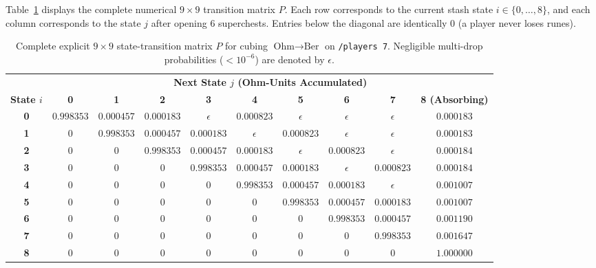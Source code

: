 \documentclass[11pt,reqno]{amsart}
\theoremstyle{definition}
\begin{document}
Table~\ref{tab:app_matrix_P} displays the complete numerical $9 \times 9$ transition matrix $P$. Each row corresponds to the current stash state $i \in \{0, \dots, 8\}$, and each column corresponds to the state $j$ after opening $6$ superchests. Entries below the diagonal are identically $0$ (a player never loses runes).

\begin{table}[htbp]
\centering
\caption{Complete explicit $9 \times 9$ state-transition matrix $P$ for cubing $\text{Ohm}\to\text{Ber}$ on \texttt{/players~7}. Negligible multi-drop probabilities ($< 10^{-6}$) are denoted by $\epsilon$.}
\label{tab:app_matrix_P}
\footnotesize
\setlength{\tabcolsep}{3.5pt}
\begin{tabular}{@{}c ccccccccc@{}}
\toprule
& \multicolumn{9}{c}{\textbf{Next State $j$ (Ohm-Units Accumulated)}} \\
\cmidrule(lr){2-10}
\textbf{State $i$} & \textbf{0} & \textbf{1} & \textbf{2} & \textbf{3} & \textbf{4} & \textbf{5} & \textbf{6} & \textbf{7} & \textbf{8 (Absorbing)} \\
\midrule
\textbf{0} & $0.998353$ & $0.000457$ & $0.000183$ & $\epsilon$ & $0.000823$ & $\epsilon$ & $\epsilon$ & $\epsilon$ & $0.000183$ \\
\textbf{1} & $0$ & $0.998353$ & $0.000457$ & $0.000183$ & $\epsilon$ & $0.000823$ & $\epsilon$ & $\epsilon$ & $0.000183$ \\
\textbf{2} & $0$ & $0$ & $0.998353$ & $0.000457$ & $0.000183$ & $\epsilon$ & $0.000823$ & $\epsilon$ & $0.000184$ \\
\textbf{3} & $0$ & $0$ & $0$ & $0.998353$ & $0.000457$ & $0.000183$ & $\epsilon$ & $0.000823$ & $0.000184$ \\
\textbf{4} & $0$ & $0$ & $0$ & $0$ & $0.998353$ & $0.000457$ & $0.000183$ & $\epsilon$ & $0.001007$ \\
\textbf{5} & $0$ & $0$ & $0$ & $0$ & $0$ & $0.998353$ & $0.000457$ & $0.000183$ & $0.001007$ \\
\textbf{6} & $0$ & $0$ & $0$ & $0$ & $0$ & $0$ & $0.998353$ & $0.000457$ & $0.001190$ \\
\textbf{7} & $0$ & $0$ & $0$ & $0$ & $0$ & $0$ & $0$ & $0.998353$ & $0.001647$ \\
\textbf{8} & $0$ & $0$ & $0$ & $0$ & $0$ & $0$ & $0$ & $0$ & $\mathbf{1.000000}$ \\
\bottomrule
\end{tabular}
\end{table}
\end{document}
